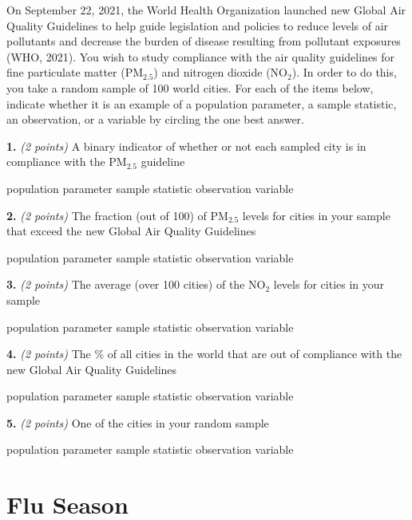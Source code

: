 \documentclass[
  11pt,
  letterpaper,
]{article}
\begin{document}
On September 22, 2021, the World Health Organization launched new Global
Air Quality Guidelines to help guide legislation and policies to reduce
levels of air pollutants and decrease the burden of disease resulting
from pollutant exposures (WHO, 2021). You wish to study compliance with
the air quality guidelines for fine particulate matter (PM\(_{2.5}\))
and nitrogen dioxide (NO\(_2\)). In order to do this, you take a random
sample of 100 world cities. For each of the items below, indicate
whether it is an example of a population parameter, a sample statistic,
an observation, or a variable by circling the one best answer.

\textbf{1.} \emph{(2 points)} A binary indicator of whether or not each
sampled city is in compliance with the PM\(_{2.5}\) guideline

population parameter \hfill sample statistic \hfill observation
\hfill variable

\vspace{0.6em}

\textbf{2.} \emph{(2 points)} The fraction (out of 100) of PM\(_{2.5}\)
levels for cities in your sample that exceed the new Global Air Quality
Guidelines

population parameter \hfill sample statistic \hfill observation
\hfill variable

\vspace{0.6em}

\textbf{3.} \emph{(2 points)} The average (over 100 cities) of the
NO\(_2\) levels for cities in your sample

population parameter \hfill sample statistic \hfill observation
\hfill variable

\vspace{0.6em}

\textbf{4.} \emph{(2 points)} The \% of all cities in the world that are
out of compliance with the new Global Air Quality Guidelines

population parameter \hfill sample statistic \hfill observation
\hfill variable

\vspace{0.6em}

\textbf{5.} \emph{(2 points)} One of the cities in your random sample

population parameter \hfill sample statistic \hfill observation
\hfill variable

\newpage

\section*{Flu Season}\label{flu-season}
\end{document}
